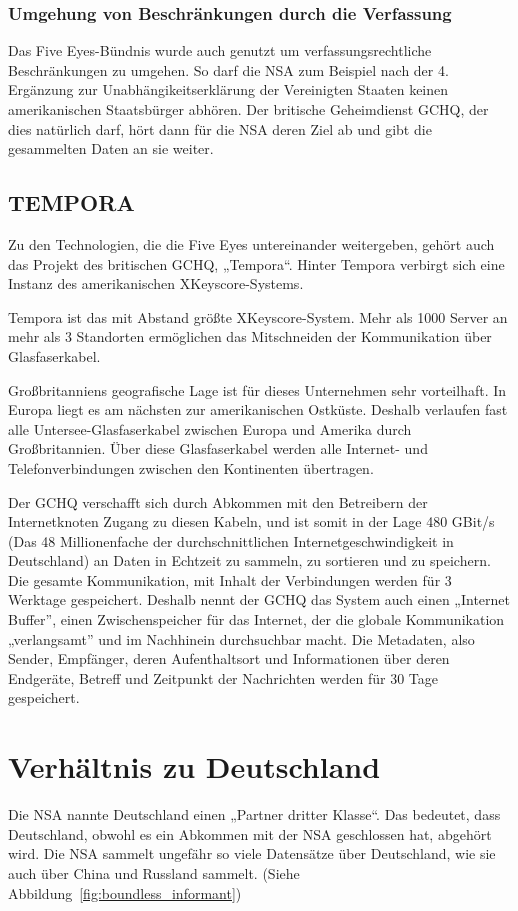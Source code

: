 \documentclass[12pt,a4paper]{scrartcl}
\begin{document}
\subsubsection{Umgehung von Beschränkungen durch die Verfassung}
Das Five Eyes-Bündnis wurde auch genutzt um verfassungsrechtliche Beschränkungen zu umgehen. So darf die NSA zum Beispiel nach der 4. Ergänzung zur Unabhängikeitserklärung der Vereinigten Staaten keinen amerikanischen Staatsbürger abhören. Der britische Geheimdienst GCHQ, der dies natürlich darf, hört dann für die NSA deren Ziel ab und gibt die gesammelten Daten an sie weiter.

\subsection{TEMPORA}
Zu den Technologien, die die Five Eyes untereinander weitergeben, gehört auch das Projekt des britischen GCHQ, „Tempora“. Hinter Tempora verbirgt sich eine Instanz des amerikanischen XKeyscore-Systems.

Tempora ist das mit Abstand größte XKeyscore-System. Mehr als 1000 Server an mehr als 3 Standorten ermöglichen das Mitschneiden der Kommunikation über Glasfaserkabel.

Großbritanniens geografische Lage ist für dieses Unternehmen sehr vorteilhaft. In Europa liegt es am nächsten zur amerikanischen Ostküste. Deshalb verlaufen fast alle Untersee-Glasfaserkabel zwischen Europa und Amerika durch Großbritannien. Über diese Glasfaserkabel werden alle Internet- und Telefonverbindungen zwischen den Kontinenten übertragen.

Der GCHQ verschafft sich durch Abkommen mit den Betreibern der Internetknoten Zugang zu diesen Kabeln, und ist somit in der Lage 480 GBit/s (Das 48 Millionenfache der durchschnittlichen Internetgeschwindigkeit in Deutschland\cite{statista_internet}) an Daten in Echtzeit zu sammeln, zu sortieren und zu speichern. Die gesamte Kommunikation, mit Inhalt der Verbindungen werden für 3 Werktage gespeichert. Deshalb nennt der GCHQ das System auch einen „Internet Buffer”, einen Zwischenspeicher für das Internet, der die globale Kommunikation „verlangsamt” und im Nachhinein durchsuchbar macht. Die Metadaten, also Sender, Empfänger, deren Aufenthaltsort und Informationen über deren Endgeräte, Betreff und Zeitpunkt der Nachrichten werden für 30 Tage gespeichert.

\section{Verhältnis zu Deutschland}
Die NSA nannte Deutschland einen „Partner dritter Klasse“. Das bedeutet, dass Deutschland, obwohl es ein Abkommen mit der NSA geschlossen hat, abgehört wird. Die NSA sammelt ungefähr so viele Datensätze über Deutschland, wie sie auch über China und Russland sammelt. (Siehe Abbildung~\ref{fig:boundless_informant})
\end{document}
